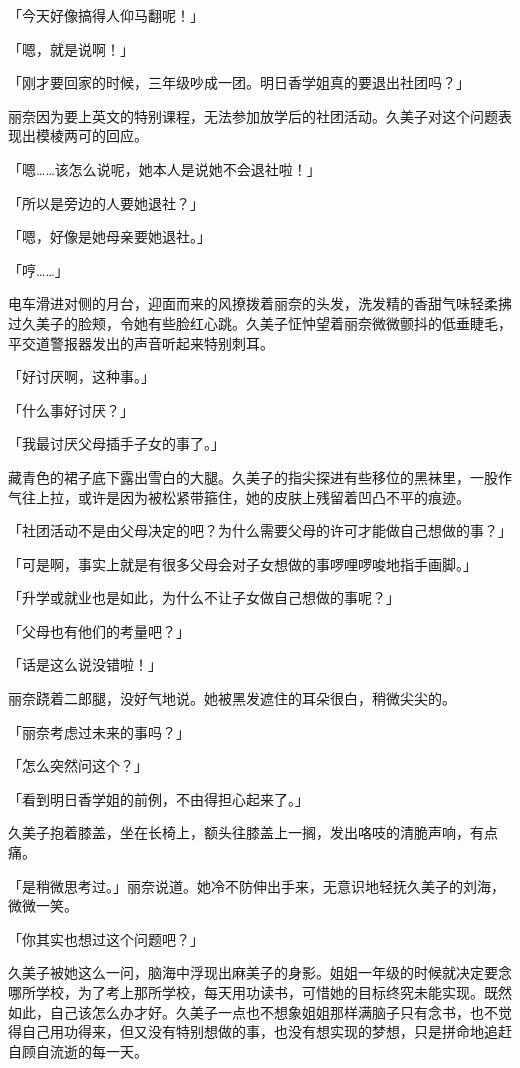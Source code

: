 \documentclass[UTF8]{ctexart}
\begin{document}
    「今天好像搞得人仰马翻呢！」 

    「嗯，就是说啊！」 

    「刚才要回家的时候，三年级吵成一团。明日香学姐真的要退出社团吗？」 

    丽奈因为要上英文的特别课程，无法参加放学后的社团活动。久美子对这个问题表现出模棱两可的回应。 

    「嗯……该怎么说呢，她本人是说她不会退社啦！」 

    「所以是旁边的人要她退社？」 

    「嗯，好像是她母亲要她退社。」 

    「哼……」 

    电车滑进对侧的月台，迎面而来的风撩拨着丽奈的头发，洗发精的香甜气味轻柔拂过久美子的脸颊，令她有些脸红心跳。久美子怔忡望着丽奈微微颤抖的低垂睫毛，平交道警报器发出的声音听起来特别刺耳。 

    「好讨厌啊，这种事。」 

    「什么事好讨厌？」 

    「我最讨厌父母插手子女的事了。」 

    藏青色的裙子底下露出雪白的大腿。久美子的指尖探进有些移位的黑袜里，一股作气往上拉，或许是因为被松紧带箍住，她的皮肤上残留着凹凸不平的痕迹。 

    「社团活动不是由父母决定的吧？为什么需要父母的许可才能做自己想做的事？」 

    「可是啊，事实上就是有很多父母会对子女想做的事啰哩啰唆地指手画脚。」 

    「升学或就业也是如此，为什么不让子女做自己想做的事呢？」 

    「父母也有他们的考量吧？」 

    「话是这么说没错啦！」 

    丽奈跷着二郎腿，没好气地说。她被黑发遮住的耳朵很白，稍微尖尖的。 

    「丽奈考虑过未来的事吗？」 

    「怎么突然问这个？」 

    「看到明日香学姐的前例，不由得担心起来了。」 

    久美子抱着膝盖，坐在长椅上，额头往膝盖上一搁，发出咯吱的清脆声响，有点痛。 

    「是稍微思考过。」丽奈说道。她冷不防伸出手来，无意识地轻抚久美子的刘海，微微一笑。 

    「你其实也想过这个问题吧？」 

    久美子被她这么一问，脑海中浮现出麻美子的身影。姐姐一年级的时候就决定要念哪所学校，为了考上那所学校，每天用功读书，可惜她的目标终究未能实现。既然如此，自己该怎么办才好。久美子一点也不想象姐姐那样满脑子只有念书，也不觉得自己用功得来，但又没有特别想做的事，也没有想实现的梦想，只是拼命地追赶自顾自流逝的每一天。 
\end{document}
